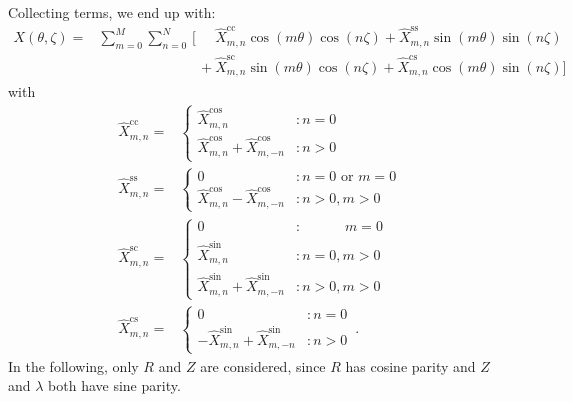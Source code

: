 Collecting terms, we end up with:
\begin{align}
  X(\theta, \zeta)
  =&          \sum_{m=0}^M \sum_{n=0}^N \,\Biggl[ \phantom{+}\, \hat{X}_{m,n}^\mathrm{cc} \cos(m \theta) \cos(n \zeta)
                                                           +    \hat{X}_{m,n}^\mathrm{ss} \sin(m \theta) \sin(n \zeta) \nonumber \\
  ~& \phantom{\sum_{m=0}^M \sum_{n=0}^N \,\Biggl[}\,       +    \hat{X}_{m,n}^\mathrm{sc} \sin(m \theta) \cos(n \zeta)
                                                           +    \hat{X}_{m,n}^\mathrm{cs} \cos(m \theta) \sin(n \zeta) \Biggr] \label{eqn:four_term_dft}
\end{align}
with
\begin{align}
  \hat{X}_{m,n}^\mathrm{cc}
  =& \begin{cases}
       \hat{X}_{m,n}^\mathrm{cos}                               &: n = 0 \\
       \hat{X}_{m,n}^\mathrm{cos} + \hat{X}_{m,-n}^\mathrm{cos} &: n > 0
     \end{cases} \\
  \hat{X}_{m,n}^\mathrm{ss}
  =& \begin{cases}
       0                                                        &: n = 0 \textrm{ or } m = 0 \\
       \hat{X}_{m,n}^\mathrm{cos} - \hat{X}_{m,-n}^\mathrm{cos} &: n > 0, m > 0
     \end{cases} \\
  \hat{X}_{m,n}^\mathrm{sc}
  =& \begin{cases}
       0                                                        &: \phantom{n = 0,\,} m = 0 \\
       \hat{X}_{m,n}^\mathrm{sin}                               &: n = 0, m > 0 \\
       \hat{X}_{m,n}^\mathrm{sin} + \hat{X}_{m,-n}^\mathrm{sin} &: n > 0, m > 0
     \end{cases} \\
  \hat{X}_{m,n}^\mathrm{cs}
  =& \begin{cases}
       0                                                         &: n = 0 \\
       -\hat{X}_{m,n}^\mathrm{sin} + \hat{X}_{m,-n}^\mathrm{sin} &: n > 0
     \end{cases} \, .
\end{align}
In the following, only $R$ and $Z$ are considered,
since $R$ has cosine parity and $Z$ and $\lambda$ both have sine parity.

